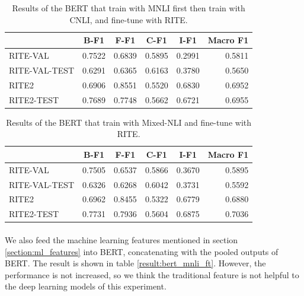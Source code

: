 \documentclass[12pt]{article}
\begin{document}
\begin{CJK*}{UTF8}{bkai}
\begin{spacing}{1.77}
\begin{table}[ht!]
  \centering
  \begin{tabular}{|l|r|r|r|r|r|}
  \hline
   & \multicolumn{1}{c|}{B-F1} & \multicolumn{1}{c|}{F-F1} & \multicolumn{1}{c|}{C-F1} & \multicolumn{1}{c|}{I-F1} & \multicolumn{1}{c|}{Macro F1} \\ \hline
  RITE-VAL & 0.7522 & 0.6839 & 0.5895 & 0.2991 & 0.5811 \\ \hline
  RITE-VAL-TEST & 0.6291 & 0.6365 & 0.6163 & 0.3780 & 0.5650 \\ \hline
  RITE2 & 0.6906 & 0.8551 & 0.5520 & 0.6830 & 0.6952 \\ \hline
  RITE2-TEST & 0.7689 & 0.7748 & 0.5662 & 0.6721 & 0.6955 \\ \hline
  \end{tabular}
  \caption{Results of the BERT that train with MNLI first then train with CNLI, and fine-tune with RITE.}
  \label{result:bert_mnli_cnli}
\end{table}

\begin{table}[ht!]
  \centering
  \begin{tabular}{|l|r|r|r|r|r|}
  \hline
   & \multicolumn{1}{c|}{B-F1} & \multicolumn{1}{c|}{F-F1} & \multicolumn{1}{c|}{C-F1} & \multicolumn{1}{c|}{I-F1} & \multicolumn{1}{c|}{Macro F1} \\ \hline
  RITE-VAL & 0.7505 & 0.6537 & 0.5866 & 0.3670 & 0.5895 \\ \hline
  RITE-VAL-TEST & 0.6326 & 0.6268 & 0.6042 & 0.3731 & 0.5592 \\ \hline
  RITE2 & 0.6962 & 0.8455 & 0.5322 & 0.6779 & 0.6880 \\ \hline
  RITE2-TEST & 0.7731 & 0.7936 & 0.5604 & 0.6875 & 0.7036 \\ \hline
  \end{tabular}
  \caption{Results of the BERT that train with Mixed-NLI and fine-tune with RITE.}
  \label{result:bert_mixed_nli}
\end{table}

\paragraph{}
We also feed the machine learning features mentioned in section \ref{section:ml_features} into BERT, concatenating with the pooled outputs of BERT. The result is shown in table \ref{result:bert_mnli_ft}. However, the performance is not increased, so we think the traditional feature is not helpful to the deep learning models of this experiment.


\end{spacing}
\end{CJK*}
\end{document}
